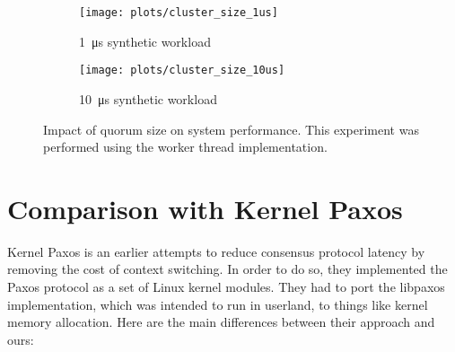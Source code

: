 \begin{figure}[p]
    \centering
    \begin{subfigure}[t]{0.8\textwidth}
        \texttt{[image: plots/cluster\_size\_1us]}
        \caption{\SI{1}{\micro\second} synthetic workload}
    \end{subfigure}

    \begin{subfigure}[t]{0.8\textwidth}
        \texttt{[image: plots/cluster\_size\_10us]}
        \caption{\SI{10}{\micro\second} synthetic workload}
    \end{subfigure}


    \caption{Impact of quorum size on system performance.
        This experiment was performed using the worker thread implementation.
    \label{fig:cluster-size}
    }
\end{figure}


% 
% 
% 


\section{Comparison with Kernel Paxos}

Kernel Paxos\cite{kernelpaxos} is an earlier attempts to reduce consensus protocol latency by removing the cost of context switching.
In order to do so, they implemented the Paxos protocol as a set of Linux kernel modules.
They had to port the libpaxos implementation, which was intended to run in userland, to things like kernel memory allocation.
Here are the main differences between their approach and ours:

